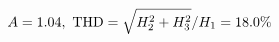 \documentclass[preview]{standalone}
\begin{document}
\begin{align*}
\special{dvisvgm:raw <g id='unique000'>}A=1.04,\ \text{THD}=\sqrt{H_2^2+H_3^2}/H_1=18.0\%\special{dvisvgm:raw </g>}
\end{align*}
\end{document}

